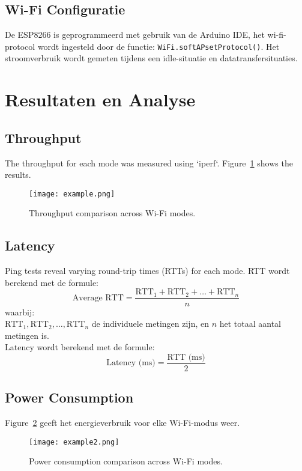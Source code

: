 \documentclass[conference]{IEEEtran}
\begin{document}
\subsection{Wi-Fi Configuratie}
 De ESP8266 is geprogrammeerd met gebruik van de Arduino IDE, het wi-fi-protocol wordt ingesteld door de functie: \texttt{WiFi.softAPsetProtocol()}. Het stroomverbruik wordt gemeten tijdens een idle-situatie en datatransfersituaties.  

\section{Resultaten en Analyse}
\subsection{Throughput}
The throughput for each mode was measured using `iperf`. Figure~\ref{fig:throughput} shows the results. \lipsum[7]

\begin{figure}[htbp]
    \centering
    \texttt{[image: example.png]}
    \caption{Throughput comparison across Wi-Fi modes.}
    \label{fig:throughput}
\end{figure}

\subsection{Latency}
Ping tests reveal varying round-trip times (RTTs) for each mode. RTT wordt berekend met de formule:
\[
\text{Average RTT} = \frac{\text{RTT}_1 + \text{RTT}_2 + \dots + \text{RTT}_n}{n}
\]
waarbij: \\
\(\text{RTT}_1, \text{RTT}_2, \dots, \text{RTT}_n\) de individuele metingen zijn, en \(n\) het totaal aantal metingen is. \\

Latency wordt berekend met de formule:
\[
\text{Latency (ms)} = \frac{\text{RTT (ms)}}{2}
\]
\subsection{Power Consumption}
Figure~\ref{fig:power} geeft het energieverbruik voor elke Wi-Fi-modus weer. \lipsum[9]

\begin{figure}[htbp]
    \centering
    \texttt{[image: example2.png]}
    \caption{Power consumption comparison across Wi-Fi modes.}
    \label{fig:power}
\end{figure}
\end{document}
